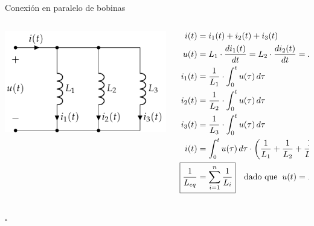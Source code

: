 \documentclass[aspectratio=169, xcolor={usenames,svgnames,dvipsnames}]{beamer}
\begin{document}
\begin{frame}{Conexión en paralelo de bobinas}
    \vspace{2mm}
    \begin{columns}
    \begin{column}{0.4\columnwidth}
        \vspace{-10mm}
        \begin{center}
        \includegraphics[width=1\linewidth]{../figs/BobinasParalelo.pdf}
        \end{center}
    \end{column}
    \begin{column}{0.6\columnwidth}
    \begin{align*}
      i(t)& = i_1(t) + i_2(t) + i_3(t)\\
      u(t) &= L_1 \cdot \frac{di_1(t)}{dt}= L_2 \cdot \frac{di_2(t)}{dt}= L_3 \cdot \frac{di_3(t)}{dt}\\
      i_1(t)&=\dfrac{1}{L_1}\cdot\int_{0}^{t} u(\tau)\, d\tau\\
      i_2(t)&=\dfrac{1}{L_2}\cdot\int_{0}^{t} u(\tau)\, d\tau\\
      i_3(t)&=\dfrac{1}{L_3}\cdot\int_{0}^{t} u(\tau)\, d\tau\\
      i(t)& = \int_{0}^{t} u(\tau)\,d\tau \cdot \left(\dfrac{1}{L_1}+\dfrac{1}{L_2}+\dfrac{1}{L_3}\right)\\
      \Aboxed{\frac{1}{L_{eq}} &= \sum_{i = 1}^n \frac{1}{L_i}} \quad \textrm{dado que} \;\; u(t) = L_{eq} \cdot \frac{di(t)}{dt}
    \end{align*}
    \end{column}
    \end{columns}
    \hyperlink{diapo:Teoremas}{.}
\end{frame}
\end{document}
